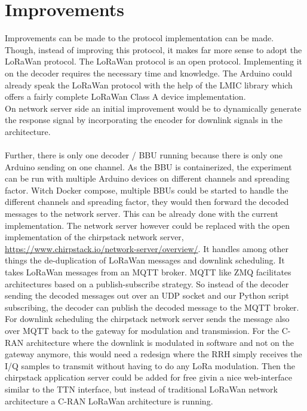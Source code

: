 \section{Improvements}
Improvements can be made to the protocol implementation can be made. Though, instead
of improving this protocol, it makes far more sense to adopt the LoRaWan protocol.
The LoRaWan protocol is an open protocol. Implementing it on the decoder requires the 
necessary time and knowledge. The Arduino could already speak the LoRaWan protocol with 
the help of the LMIC library which offers a fairly complete LoRaWan Class A device implementation.
\\
On network server side an initial improvement would be to dynamically generate the response signal
by incorporating the encoder for downlink signals in the architecture.
\\ \\
Further, there is only one decoder / BBU running because there is only one Arduino sending on one channel.
As the BBU is containerized, the experiment can be run with multiple Arduino devices on different 
channels and spreading factor. Witch Docker compose, multiple BBUs could be started to handle the different 
channels and spreading factor, they would then forward the decoded messages to the network server.
This can be already done with the current implementation. The network server however could be replaced 
with the open implementation of the chirpstack network server, \url{https://www.chirpstack.io/network-server/overview/}. 
It handles among other things the de-duplication of LoRaWan messages and downlink scheduling.
It takes LoRaWan messages from an MQTT broker. MQTT like ZMQ facilitates architectures based on a publish-subscribe strategy. So instead of the decoder sending the decoded messages 
out over an UDP socket and our Python script subscribing, the decoder can publish the decoded message to the 
MQTT broker. For downlink scheduling the chirpstack network server sends the message also over MQTT
back to the gateway for modulation and transmission. For the C-RAN architecture where the downlink is modulated 
in software and not on the gateway anymore, this would need a redesign where the RRH simply receives the I/Q samples
to transmit without having to do any LoRa modulation. Then the chirpstack application server could be 
added for free givin a nice web-interface similar to the TTN interface, but instead of 
traditional LoRaWan network architecture a C-RAN LoRaWan architecture is running.
\\ \\
